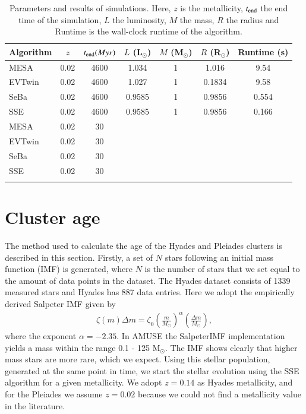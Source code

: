 \documentclass{aa}
\newcommand{\Sun}[0]{\ensuremath{_{\odot}}}
\begin{document}
\setlength\tabcolsep{2pt}
\begin{table}
    \caption[]{Parameters and results of simulations. Here, $z$ is the metallicity, $t_{\rm end}$ the end time of the simulation, $L$ the luminosity, $M$ the mass, $R$ the radius and Runtime is the wall-clock runtime of the algorithm.}
    \label{tab:parameterspace}
    \begin{tabular}{lcccccc}
        \hline
        \noalign{\smallskip}
        Algorithm & $z$ & $t_{\rm end} (Myr)$ & $L$ (L\Sun) & $M$ (M\Sun) & $R$ (R\Sun) & Runtime (s) \\
        \hline
        \noalign{\smallskip}
        MESA & 0.02 & 4600 & 1.034 & 1 & 1.016 & 9.54 \\
        EVTwin  & 0.02 & 4600 & 1.027 & 1 & 0.1834 & 9.58 \\
        SeBa & 0.02 & 4600 & 0.9585 & 1 & 0.9856 & 0.554 \\
        SSE & 0.02 & 4600 & 0.9585 & 1 & 0.9856 & 0.166 \\
        MESA & 0.02 & 30 &  &  &  &  \\
        EVTwin & 0.02 & 30 &  &  &  &  \\
        SeBa & 0.02 & 30 &  &  &  &  \\
        SSE & 0.02 & 30 &  &  &  &  \\
        \hline
        \noalign{\smallskip}
        \noalign{\smallskip}
    \end{tabular}
\end{table}

\section{Cluster age}\label{sec:isochrones}
The method used to calculate the age of the Hyades and Pleiades clusters is described in this section. Firstly, a set of $N$ stars following an initial mass function (IMF) is generated, where $N$ is the number of stars that we set equal to the amount of data points in the dataset. The Hyades dataset consists of 1339 measured stars and Hyades has 887 data entries. Here we adopt the empirically derived Salpeter IMF \citep{1955ApJ...121..161S} given by
\begin{eqnarray}
    \zeta(m) \Delta m = \zeta_0 \left(\frac{m}{M\Sun}\right)^{\alpha} \left(\frac{\Delta m}{M\Sun}\right),
\end{eqnarray} where the exponent $\alpha = -2.35$. In AMUSE the SalpeterIMF implementation yields a mass within the range 0.1 - 125 M\Sun. The IMF shows clearly that higher mass stars are more rare, which we expect. Using this stellar population, generated at the same point in time, we start the stellar evolution using the SSE algorithm for a given metallicity. We adopt $z = 0.14$ \citep{1998A&A...331...81P} as Hyades metallicity, and for the Pleiades we assume $z = 0.02$ because we could not find a metallicity value in the literature.
\end{document}
